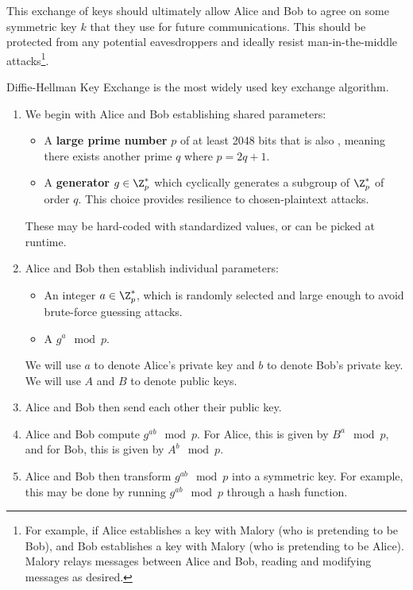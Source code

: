 This exchange of keys should ultimately allow Alice and Bob to agree on some symmetric key $k$ that they use for future communications. This should be protected from any potential eavesdroppers and ideally resist man-in-the-middle attacks\footnote{For example, if Alice establishes a key with Malory (who is pretending to be Bob), and Bob establishes a key with Malory (who is pretending to be Alice). Malory relays messages between Alice and Bob, reading and modifying messages as desired.}.

\begin{tecbox}{Diffie-Hellman Key Exchange}{}
     is the most widely used key exchange algorithm.
    \begin{enumerate}
        \item We begin with Alice and Bob establishing shared parameters:
        \begin{itemize}
            \item A \textbf{large prime number} $p$ of at least 2048 bits that is also , meaning there exists another prime $q$ where $p = 2q + 1$.
            \item A \textbf{generator} $g \in \Z_p^*$ which cyclically generates a subgroup of $\Z_p^*$ of order $q$. This choice provides resilience to chosen-plaintext attacks.
        \end{itemize}
        These may be hard-coded with standardized values, or can be picked at runtime.
        \item Alice and Bob then establish individual parameters:
        \begin{itemize}
            \item An integer  $a \in \Z_p^*$, which is randomly selected and large enough to avoid brute-force guessing attacks.
            \item A  $g^a \mod{p}$.
        \end{itemize}
        We will use $a$ to denote Alice's private key and $b$ to denote Bob's private key. We will use $A$ and $B$ to denote public keys.
        \item Alice and Bob then send each other their public key.
        \item Alice and Bob compute $g^{ab} \mod p$. For Alice, this is given by $B^a \mod p$, and for Bob, this is given by $A^b \mod p$.
        \item Alice and Bob then transform $g^{ab} \mod p$ into a symmetric key. For example, this may be done by running $g^{ab} \mod p$ through a hash function.
    \end{enumerate}
\end{tecbox}

